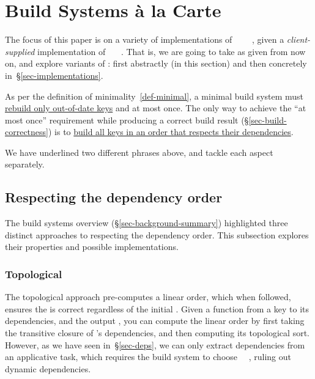 \section{Build Systems \`a la Carte}\label{sec-build}

The focus of this paper is on a variety of implementations of
~~~~, given
a \emph{client-supplied} implementation of ~~~. That
is, we are going to take  as given from now on, and explore variants of
: first abstractly (in this section) and then concretely
in~\S\ref{sec-implementations}.

As per the definition of minimality~\ref{def-minimal}, a minimal build
system must \underline{rebuild only out-of-date keys} and at most once. The only
way to achieve the ``at most once'' requirement while producing a correct build
result (\S\ref{sec-build-correctness}) is to \underline{build all keys in an
order that respects their dependencies}.

\vspace{1mm}
We have underlined two different phrases above, and tackle each aspect separately.

\subsection{Respecting the dependency order}
\label{sec-dependency-orderings}

The build systems overview (\S\ref{sec-background-summary}) highlighted three
distinct approaches to respecting the dependency order. This subsection explores
their properties and possible implementations.

\subsubsection{Topological}\label{sec-topological}

The topological approach pre-computes a linear order, which when followed, ensures
the  is correct regardless of the initial . Given a function
from a key to its dependencies, and the output , you can compute the
linear order by first taking the transitive closure of 's dependencies,
and then computing its topological sort. However, as we have seen
in~\S\ref{sec-deps}, we can only extract dependencies from an applicative task,
which requires the build system to choose ~\hs{=}~, ruling
out dynamic dependencies.

